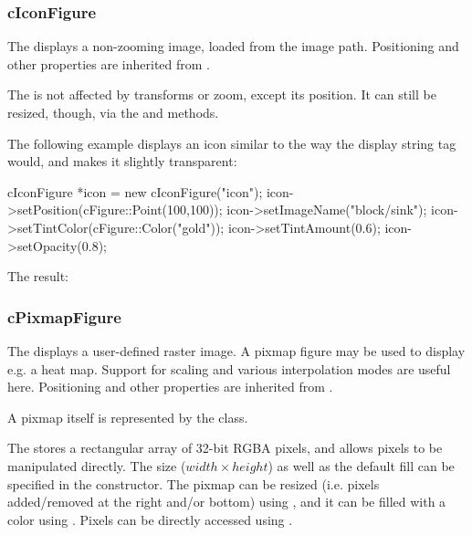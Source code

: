 

\subsubsection{cIconFigure}
\label{sec:graphics:iconfigure}

The  displays a non-zooming image, loaded from the {\opp}
image path. Positioning and other properties are inherited from
.

The  is not affected by transforms or zoom, except its
position. It can still be resized, though, via the  and
 methods.

The following example displays an icon similar to the way the
 display string tag would, and makes it slightly
transparent:

\begin{cpp}
cIconFigure *icon = new cIconFigure("icon");
icon->setPosition(cFigure::Point(100,100));
icon->setImageName("block/sink");
icon->setTintColor(cFigure::Color("gold"));
icon->setTintAmount(0.6);
icon->setOpacity(0.8);
\end{cpp}


The result:

\begin{center}
\end{center}


\subsubsection{cPixmapFigure}
\label{sec:graphics:pixmapfigure}

The  displays a user-defined raster image. A pixmap
figure may be used to display e.g. a heat map. Support for scaling and
various interpolation modes are useful here. Positioning and other
properties are inherited from .

A pixmap itself is represented by the  class.

The  stores a rectangular array of 32-bit RGBA pixels,
and allows pixels to be manipulated directly. The size ($width \times height$)
as well as the default fill can be specified in the constructor.
The pixmap can be resized (i.e. pixels added/removed at the right and/or bottom)
using , and it can be filled with a color using .
Pixels can be directly accessed using .

